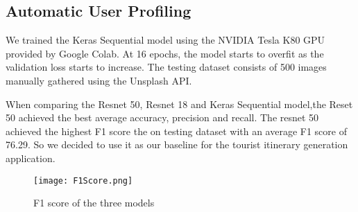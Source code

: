 \subsection{Automatic User Profiling}

We trained the Keras Sequential model using the NVIDIA
Tesla K80 GPU provided by Google Colab. At 16 epochs,
the model starts to overfit as the validation loss
starts to increase. The testing dataset consists of
500 images manually gathered using the Unsplash API. 


When comparing the Resnet 50, Resnet 18 and Keras
Sequential model,the Reset 50 achieved the best
average accuracy, precision and recall. The resnet 50 achieved the highest F1 score the
on testing dataset with an average F1 score of 76.29. So
we decided to use it as our baseline for the tourist
itinerary generation application.

\begin{figure}[h]
\centering
\texttt{[image: F1Score.png]}
\caption{F1 score of the three models}
\label{f1}
\end{figure}


